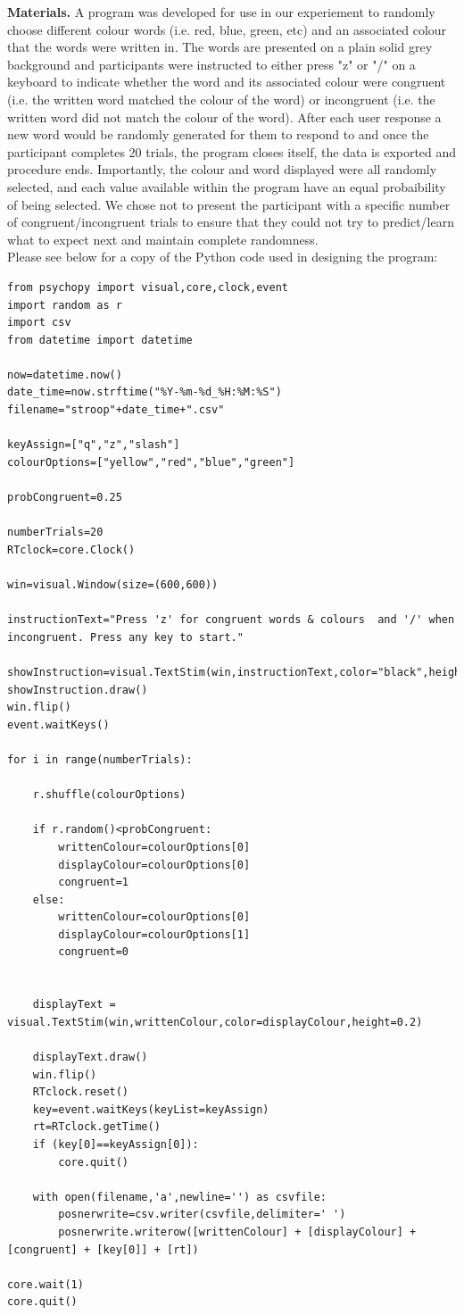 \documentclass{article}
\begin{document}
\textbf{Materials.} A program was developed for use in our experiement to randomly choose different colour words (i.e. red, blue, green, etc) and an associated colour that the words were written in. The words are presented on a plain solid grey background and participants were instructed to either press "z" or "/" on a keyboard to indicate whether the word and its associated colour were congruent (i.e. the written word matched the colour of the word) or incongruent (i.e. the written word did not match the colour of the word). After each user response a new word would be randomly generated for them to respond to and once the participant completes 20 trials, the program closes itself, the data is exported and procedure ends. Importantly, the colour and word displayed were all randomly selected, and each value available within the program have an equal probaibility of being selected. We chose not to present the participant with a specific number of congruent/incongruent trials to ensure that they could not try to predict/learn what to expect next and maintain complete randomness. \\

Please see below for a copy of the Python code used in designing the program:
\begin{verbatim}
from psychopy import visual,core,clock,event
import random as r
import csv
from datetime import datetime

now=datetime.now()
date_time=now.strftime("%Y-%m-%d_%H:%M:%S")
filename="stroop"+date_time+".csv"

keyAssign=["q","z","slash"]
colourOptions=["yellow","red","blue","green"]

probCongruent=0.25

numberTrials=20
RTclock=core.Clock()

win=visual.Window(size=(600,600))

instructionText="Press 'z' for congruent words & colours  and '/' when incongruent. Press any key to start."

showInstruction=visual.TextStim(win,instructionText,color="black",height=0.1)
showInstruction.draw()
win.flip()
event.waitKeys()

for i in range(numberTrials):

	r.shuffle(colourOptions)

	if r.random()<probCongruent:
		writtenColour=colourOptions[0]
		displayColour=colourOptions[0]
		congruent=1
	else:
		writtenColour=colourOptions[0]
		displayColour=colourOptions[1]
		congruent=0


	displayText = visual.TextStim(win,writtenColour,color=displayColour,height=0.2)

	displayText.draw()
	win.flip()
	RTclock.reset()
	key=event.waitKeys(keyList=keyAssign)
	rt=RTclock.getTime()
	if (key[0]==keyAssign[0]):
		core.quit()

	with open(filename,'a',newline='') as csvfile:
		posnerwrite=csv.writer(csvfile,delimiter=' ')
		posnerwrite.writerow([writtenColour] + [displayColour] + [congruent] + [key[0]] + [rt])

core.wait(1)
core.quit()
\end{verbatim}
\end{document}

